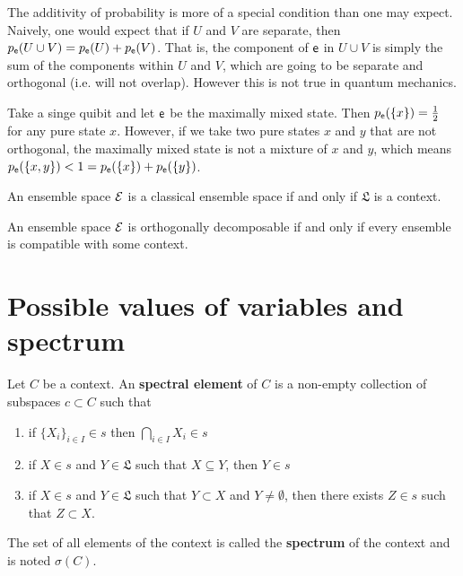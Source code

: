 \begin{remark}
	The additivity of probability is more of a special condition than one may expect. Naively, one would expect that if $U$ and $V$ are separate, then $p_{\mathsf{e}}(U \cup V) = p_{\mathsf{e}}(U) + p_{\mathsf{e}}(V)$. That is, the component of $\mathsf{e}$ in $U \cup V$ is simply the sum of the components within $U$ and $V$, which are going to be separate and orthogonal (i.e. will not overlap). However this is not true in quantum mechanics.
	
	Take a singe quibit and let $\mathsf{e}$ be the maximally mixed state. Then $p_{\mathsf{e}}(\{x\}) = \frac{1}{2}$ for any pure state $x$. However, if we take two pure states $x$ and $y$ that are not orthogonal, the maximally mixed state is not a mixture of $x$ and $y$, which means $p_{\mathsf{e}}(\{x, y\}) < 1 = p_{\mathsf{e}}(\{x\}) + p_{\mathsf{e}}(\{y\})$.
\end{remark}

\begin{conj}
	An ensemble space $\mathcal{E}$ is a classical ensemble space if and only if $\mathfrak{L}$ is a context.
\end{conj}

\begin{conj}
	An ensemble space $\mathcal{E}$ is orthogonally decomposable if and only if every ensemble is compatible with some context.
\end{conj}

\section{Possible values of variables and spectrum}

\begin{defn}
	Let $C$ be a context. An \textbf{spectral element} of $C$ is a non-empty collection of subspaces $c \subset C$ such that
	\begin{enumerate}
		\item if $\{X_i\}_{i \in I} \in s$ then $\bigcap_{i \in I} X_i \in s$
		\item if $X \in s$ and $Y \in \mathfrak{L}$ such that $X \subseteq Y$, then $Y \in s$
		\item if $X \in s$ and $Y \in \mathfrak{L}$ such that $Y \subset X$ and $Y \neq \emptyset$, then there exists $Z \in s$ such that $Z \subset X$.
	\end{enumerate}
	The set of all elements of the context is called the \textbf{spectrum} of the context and is noted $\sigma(C)$.
\end{defn}

